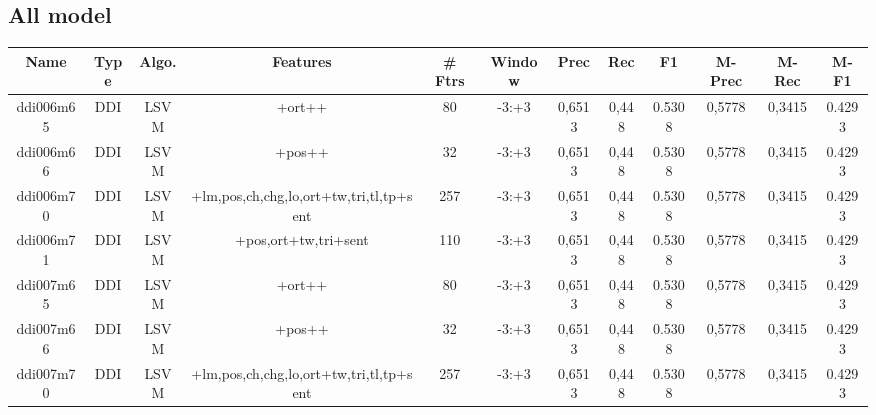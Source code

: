 \documentclass[a4paper]{article}
\begin{document}
\begin{landscape}
\section{All model }


\begin{center}
\begin{tabular}{ |c|c|c|c|c|c|c|c|c|c|c|c|} 
 \hline
 	Name & Type & Algo. & Features & \# Ftrs & Window & Prec & Rec & F1 & M-Prec & M-Rec & M-F1\\
 \hline
 
 	
 	\small{ ddi006m65 } & \small{ DDI} & \small{  LSVM }  & +ort++  &  80 &  \small{  -3:+3 }  &  0,6513 & 0,448 & 0.5308  &  0,5778 & 0,3415 & 0.4293 \\
 	

 
 	
 	\small{ ddi006m66 } & \small{ DDI} & \small{  LSVM }  & +pos++  &  32 &  \small{  -3:+3 }  &  0,6513 & 0,448 & 0.5308  &  0,5778 & 0,3415 & 0.4293 \\
 	

 
 	
 	\small{ ddi006m70 } & \small{ DDI} & \small{  LSVM }  & +lm,pos,ch,chg,lo,ort+tw,tri,tl,tp+sent  &  257 &  \small{  -3:+3 }  &  0,6513 & 0,448 & 0.5308  &  0,5778 & 0,3415 & 0.4293 \\
 	

 
 	
 	\small{ ddi006m71 } & \small{ DDI} & \small{  LSVM }  & +pos,ort+tw,tri+sent  &  110 &  \small{  -3:+3 }  &  0,6513 & 0,448 & 0.5308  &  0,5778 & 0,3415 & 0.4293 \\
 	

 
 	
 	\small{ ddi007m65 } & \small{ DDI} & \small{  LSVM }  & +ort++  &  80 &  \small{  -3:+3 }  &  0,6513 & 0,448 & 0.5308  &  0,5778 & 0,3415 & 0.4293 \\
 	

 
 	
 	\small{ ddi007m66 } & \small{ DDI} & \small{  LSVM }  & +pos++  &  32 &  \small{  -3:+3 }  &  0,6513 & 0,448 & 0.5308  &  0,5778 & 0,3415 & 0.4293 \\
 	

 
 	
 	\small{ ddi007m70 } & \small{ DDI} & \small{  LSVM }  & +lm,pos,ch,chg,lo,ort+tw,tri,tl,tp+sent  &  257 &  \small{  -3:+3 }  &  0,6513 & 0,448 & 0.5308  &  0,5778 & 0,3415 & 0.4293 \\
 	


\end{tabular}
\end{center}
\end{landscape}
\end{document}
